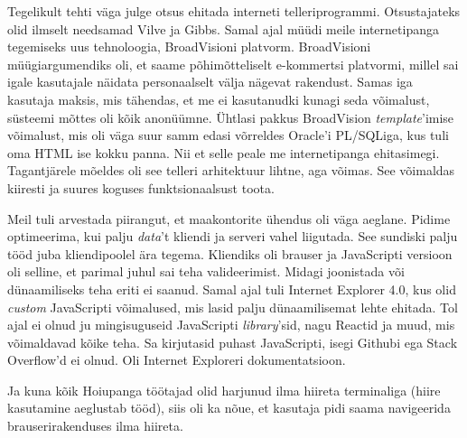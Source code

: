 Tegelikult tehti väga julge otsus ehitada interneti telleriprogrammi. Otsustajateks olid ilmselt needsamad Vilve ja 
Gibbs. Samal ajal müüdi meile internetipanga tegemiseks uus tehnoloogia, BroadVisioni platvorm. 
BroadVisioni müügiargumendiks oli, et saame põhimõtteliselt e-kommertsi 
platvormi, millel sai igale kasutajale näidata personaalselt välja nägevat 
rakendust.
Samas iga kasutaja maksis, mis tähendas, et me ei kasutanudki kunagi seda
võimalust, süsteemi mõttes oli kõik anonüümne. Ühtlasi pakkus BroadVision
\emph{template}'imise võimalust, mis oli väga suur samm edasi võrreldes Oracle'i 
PL/SQLiga, kus tuli oma HTML ise kokku panna. Nii et selle peale me interneti{\-}panga ehitasimegi. 
Tagantjärele mõeldes oli see telleri arhitektuur lihtne, aga võimas. See võimaldas 
kiiresti ja suures koguses funktsionaalsust toota.


Meil tuli arvestada piirangut, et maakontorite ühendus oli väga aeglane. 
Pidime optimeerima, kui palju \emph{data}'t kliendi ja serveri 
vahel liigutada. See sundiski palju tööd juba 
kliendipoolel ära tegema. Kliendiks oli brauser ja JavaScripti versioon oli 
selline, et parimal juhul sai teha valideerimist. Midagi joonistada või dünaamiliseks teha eriti
ei saanud. Samal ajal tuli 
Internet Explorer 4.0, kus olid \emph{custom} 
JavaScripti võimalused, mis lasid palju dünaamilisemat 
lehte ehitada. Tol ajal ei olnud ju mingisuguseid JavaScripti \emph{library}'sid, nagu 
Reactid ja muud, mis võimaldavad kõike teha. Sa kirjutasid puhast 
JavaScripti, isegi Githubi ega Stack Overflow'd ei olnud. Oli Internet Exploreri 
dokumentatsioon.

Ja kuna kõik Hoiupanga töötajad olid harjunud ilma hiireta
terminaliga (hiire kasutamine aeglustab tööd), siis oli ka 
nõue, et kasutaja pidi saama navigeerida brauserirakenduses ilma hiireta. 


